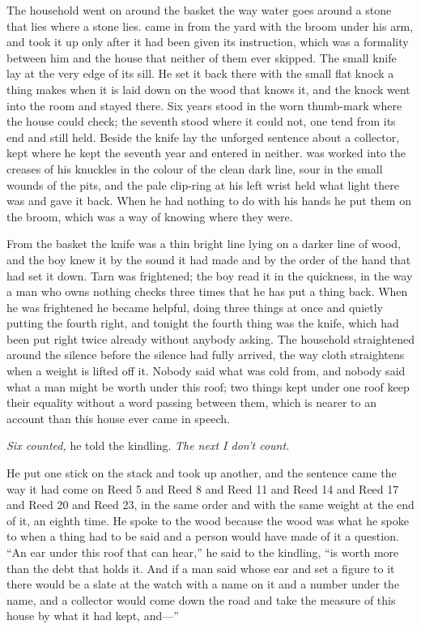 The household went on around the basket the way water goes around a stone that lies where a stone lies.  came in from the yard with the broom under his arm, and took it up only after it had been given its instruction, which was a formality between him and the house that neither of them ever skipped. The small knife lay at the very edge of its sill. He set it back there with the small flat knock a thing makes when it is laid down on the wood that knows it, and the knock went into the room and stayed there. Six years stood in the worn thumb-mark where the house could check; the seventh stood where it could not, one tend from its end and still held. Beside the knife lay the unforged sentence about a collector, kept where he kept the seventh year and entered in neither.  was worked into the creases of his knuckles in the colour of the clean dark line, sour in the small wounds of the pits, and the pale clip-ring at his left wrist held what light there was and gave it back. When he had nothing to do with his hands he put them on the broom, which was a way of knowing where they were.

From the basket the knife was a thin bright line lying on a darker line of wood, and the boy knew it by the sound it had made and by the order of the hand that had set it down. Tarn was frightened; the boy read it in the quickness, in the way a man who owns nothing checks three times that he has put a thing back. When he was frightened he became helpful, doing three things at once and quietly putting the fourth right, and tonight the fourth thing was the knife, which had been put right twice already without anybody asking. The household straightened around the silence before the silence had fully arrived, the way cloth straightens when a weight is lifted off it. Nobody said what  was cold from, and nobody said what a man might be worth under this roof; two things kept under one roof keep their equality without a word passing between them, which is nearer to an account than this house ever came in speech.

\emph{Six counted,} he told the kindling. \emph{The next I don't count.}

He put one stick on the stack and took up another, and the sentence came the way it had come on Reed 5 and Reed 8 and Reed 11 and Reed 14 and Reed 17 and Reed 20 and Reed 23, in the same order and with the same weight at the end of it, an eighth time. He spoke to the wood because the wood was what he spoke to when a thing had to be said and a person would have made of it a question. “An ear under this roof that can hear,” he said to the kindling, “is worth more than the debt that holds it. And if a man said whose ear and set a figure to it there would be a slate at the watch with a name on it and a number under the name, and a collector would come down the road and take the measure of this house by what it had kept, and---”

